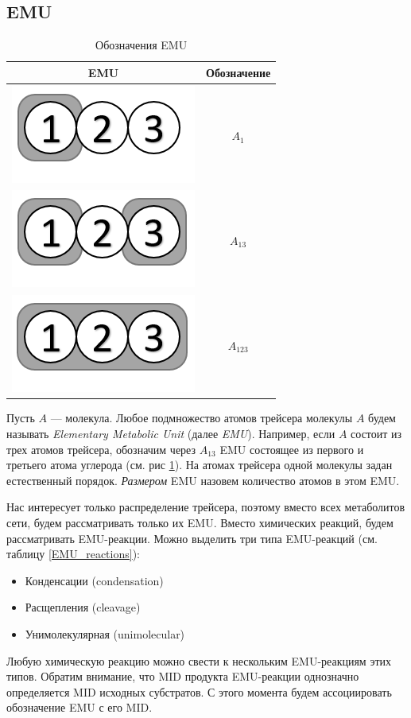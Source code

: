 \documentclass[14pt, a4paper]{extreport}
\begin{document}
\subsection{EMU}

\begin{table}
	\begin{tabular}{c | c}
		EMU & Обозначение\\
		\hline
		\includegraphics[scale=0.6]{emus/EMUA1.png} & $A_1$\\
		\hline
		\includegraphics[scale=0.6]{emus/EMU13.png} & $A_{13}$\\
		\hline
		\includegraphics[scale=0.6]{emus/EMU123.png} & $A_{123}$\\
	\end{tabular}
	\caption{Обозначения EMU}
	\label{EMU}
\end{table}

Пусть $A$ --- молекула. Любое подмножество атомов трейсера молекулы $A$ будем называть \emph{Elementary Metabolic Unit} (далее \emph{EMU}). Например, если $A$ состоит из трех атомов трейсера, обозначим через $A_{13}$ EMU состоящее из первого и третьего атома углерода (см. рис \ref{EMU}). На атомах трейсера одной молекулы задан естественный порядок. \emph{Размером} EMU назовем количество атомов в этом EMU.

Нас интересует только распределение трейсера, поэтому вместо всех метаболитов сети, будем рассматривать только их EMU. Вместо химических реакций, будем рассматривать EMU-реакции. Можно выделить три типа EMU-реакций (см. таблицу \ref{EMU_reactions}):
\begin{itemize}
	\item Конденсации (condensation)
	\item Расщепления (cleavage)
	\item Унимолекулярная (unimolecular)
\end{itemize}
Любую химическую реакцию можно свести к нескольким EMU-реакциям этих типов. Обратим внимание, что MID продукта EMU-реакции однозначно определяется MID исходных субстратов. С этого момента будем ассоциировать обозначение EMU с его MID.
\end{document}
